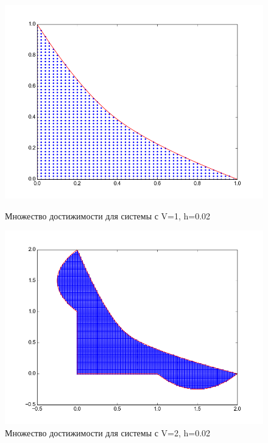 \begin{figure}
\centering
\begin{minipage}[h]{0.47\linewidth}
  \noindent \hfil
  \includegraphics[width=1\linewidth]{img/figure_v_1_h_002.png}
  \hfil \caption{Множество достижимости для системы с V=1, h=0.02}
  \label{fig:v1h0.02}
\end{minipage}
\vfill
\begin{minipage}[h]{0.47\linewidth}
  \noindent \hfil
  \includegraphics[width=1\linewidth]{img/figure_v_2_h_002.png}
  \hfil \caption{Множество достижимости для системы с V=2, h=0.02}
  \label{fig:v2h0.02}
\end{minipage}
\vfill


\end{figure}

